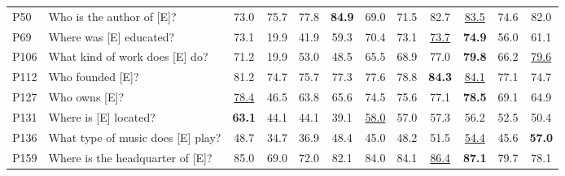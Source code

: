 \documentclass[letterpaper]{article} \usepackage{aaai23}  \usepackage{times}  \usepackage{helvet}  \usepackage{courier}  \usepackage[hyphens]{url}  \usepackage{graphicx} \urlstyle{rm} \def\UrlFont{\rm}  \usepackage{natbib}  \usepackage{caption} \frenchspacing  \setlength{\pdfpagewidth}{8.5in}  \setlength{\pdfpageheight}{11in}  \usepackage{algorithm}
\begin{document}
\begin{table*}
{\begin{tabular}{llcccccccccc}
			P50                                                   & Who is the author of [E]?               & 73.0             & 75.7            & 77.8               & \textbf{84.9}    & 69.0                         & 71.5                        & 82.7               & \underline{83.5}  & 74.6                & 82.0                     \\
			P69                                                   & Where was [E] educated?                 & 73.1             & 19.9            & 41.9               & 59.3             & 70.4                         & 73.1                        & \underline{73.7}   & \textbf{74.9}     & 56.0                & 61.1                     \\
			P106                                                  & What kind of work does [E] do?          & 71.2             & 19.9            & 53.0               & 48.5             & 65.5                         & 68.9                        & 77.0               & \textbf{79.8}     & 66.2                & \underline{79.6}         \\
			P112                                                  & Who founded [E]?                        & 81.2             & 74.7            & 75.7               & 77.3             & 77.6                         & 78.8                        & \textbf{84.3}      & \underline{84.1}  & 77.1                & 74.7                     \\
			P127                                                  & Who owns [E]?                           & \underline{78.4} & 46.5            & 63.8               & 65.6             & 74.5                         & 75.6                        & 77.1               & \textbf{78.5}     & 69.1                & 64.9                     \\
			P131                                                  & Where is [E] located?                   & \textbf{63.1}    & 44.1            & 44.1               & 39.1             & \underline{58.0}             & 57.0                        & 57.3               & 56.2              & 52.5                & 50.4                     \\
			P136                                                  & What type of music does [E] play?       & 48.7             & 34.7            & 36.9               & 48.4             & 45.0                         & 48.2                        & 51.5               & \underline{54.4}  & 45.6                & \textbf{57.0}            \\
			P159                                                  & Where is the headquarter of [E]?        & 85.0             & 69.0            & 72.0               & 82.1             & 84.0                         & 84.1                        & \underline{86.4}   & \textbf{87.1}     & 79.7                & 78.1                     \\

\end{tabular}}
\end{table*}
\end{document}

